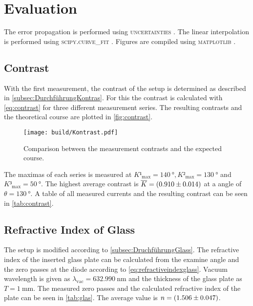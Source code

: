 \section{Evaluation}
\label{sec:auswertung}


The error propagation is performed using  \textsc{uncertainties} \cite{uncertainties}. The linear interpolation is performed using \textsc{scipy.curve\_fit} \cite{scipy}.
Figures are compiled using \textsc{matplotlib} \cite{matplotlib}. 
%

\subsection{Contrast}

With the first measurement, the contrast of the setup is determined as described in \autoref{subsec:DurchführungKontras}.
For this the contrast is calculated with \autoref{eq:contrast} for three different measurement series. 
The resulting contrasts and the theoretical course are plotted in \autoref{fig:contrast}.

\begin{figure}[H]
    \centering
    \texttt{[image: build/Kontrast.pdf]}
    \caption{Comparison between the measurement contrasts and the expected course.}
    \label{fig:contrast}
\end{figure}

The maximas of each series is measured at $K¹_{\text{max}} = \SI{140}{\degree},K²_{\text{max}} = \SI{130}{\degree}$ and $K³_{\text{max}} = \SI{50}{\degree}$.
The highest average contrast is $\overline{K} =  \SI{0.910 \pm 0.014}{}$ at a angle of $\theta = \SI{130}{\degree}$.
A table of all measured currents and the resulting contrast can be seen in \autoref{tab:contrast}.



\subsection{Refractive Index of Glass}

The setup is modified according to \autoref{subsec:DruchführungGlass}. 
The refractive index of the inserted glass plate can be calculated from the examine angle and the zero passes at the diode according to \eqref{eq:refractiveindexglass}.
Vacuum wavelength is given as $\lambda_\text{vac} = \SI{632.990}{\nano\meter}$ \cite{v64} and the thickness of the glass plate as $T = \SI{1}{\milli\meter}$.
The measured zero passes and the calculated refractive index of the plate can be seen in \autoref{tab:glas}. The average value is $n = \SI{1.506 \pm 0.047}{}$.



